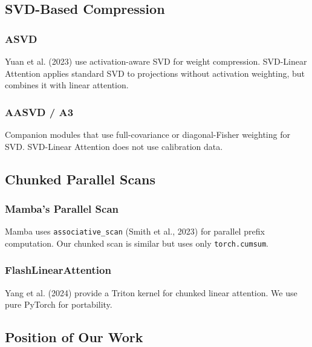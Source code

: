 \subsection{SVD-Based Compression}

\subsubsection{ASVD}

Yuan et al. (2023) use activation-aware SVD for weight compression. 
SVD-Linear Attention applies standard SVD to projections without 
activation weighting, but combines it with linear attention.

\subsubsection{AASVD / A3}

Companion modules that use full-covariance or diagonal-Fisher weighting 
for SVD. SVD-Linear Attention does not use calibration data.

\subsection{Chunked Parallel Scans}

\subsubsection{Mamba's Parallel Scan}

Mamba uses \texttt{associative\_scan} (Smith et al., 2023) for parallel prefix 
computation. Our chunked scan is similar but uses only \texttt{torch.cumsum}.

\subsubsection{FlashLinearAttention}

Yang et al. (2024) provide a Triton kernel for chunked linear attention. 
We use pure PyTorch for portability.

\subsection{Position of Our Work}

